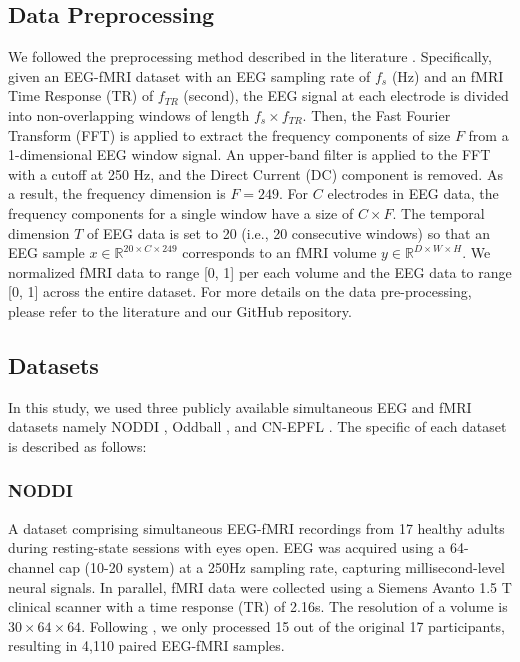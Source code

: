 \subsection{Data Preprocessing}
We followed the preprocessing method described in the literature \cite{calhas2022eeg}. 
Specifically, given an EEG-fMRI dataset with an EEG sampling rate of $f_s$ (Hz) and an fMRI Time Response (TR) of $f_{TR}$ (second), the EEG signal at each electrode is divided into non-overlapping windows of length $f_s \times f_{TR}$. 
Then, the Fast Fourier Transform (FFT) is applied to extract the frequency components of size $F$ from a 1-dimensional EEG window signal. 
An upper-band filter is applied to the FFT with a cutoff at 250 Hz, and the Direct Current (DC) component is removed. 
As a result, the frequency dimension is $F = 249$. 
For $C$ electrodes in EEG data, the frequency components for a single window have a size of $C \times F$. 
The temporal dimension $T$ of EEG data is set to 20 (i.e., 20 consecutive windows) so that an EEG sample $x \in \mathbb{R}^{20 \times C \times 249}$ corresponds to an fMRI volume $y \in \mathbb{R}^{D \times W \times H}$. 
We normalized fMRI data to range [0, 1] per each volume and the EEG data to range [0, 1] across the entire dataset. For more details on the data pre-processing, please refer to the literature \cite{calhas2022eeg} and our GitHub repository. 

\subsection{Datasets}
In this study, we used three publicly available simultaneous EEG and fMRI datasets namely NODDI \cite{deligianni2014relating}, Oddball \cite{walz2015prestimulus}, and CN-EPFL \cite{pereira2020disentangling}. 
The specific of each dataset is described as follows: 
\subsubsection{NODDI}
A dataset comprising simultaneous EEG-fMRI recordings from 17 healthy adults during resting-state sessions with eyes open. 
EEG was acquired using a 64-channel cap (10-20 system) at a 250Hz sampling rate, capturing millisecond-level neural signals. 
In parallel, fMRI data were collected using a Siemens Avanto 1.5 T clinical scanner with a time response (TR) of 2.16s. 
The resolution of a volume is $30 \times 64 \times 64$. 
Following \cite{lanzino2024nt}, we only processed 15 out of the original 17 participants, resulting in 4,110 paired EEG-fMRI samples. 

